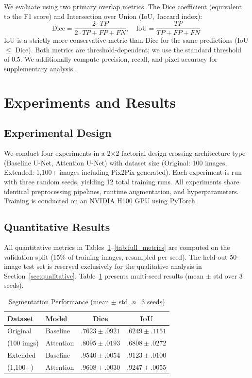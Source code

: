 \documentclass[conference]{IEEEtran}
\begin{document}
We evaluate using two primary overlap metrics. The Dice coefficient (equivalent to the F1 score) and Intersection over Union (IoU, Jaccard index):
\begin{equation}
\text{Dice} = \frac{2 \cdot TP}{2 \cdot TP + FP + FN}, \quad \text{IoU} = \frac{TP}{TP + FP + FN}
\end{equation}
IoU is a strictly more conservative metric than Dice for the same predictions (IoU $\leq$ Dice). Both metrics are threshold-dependent; we use the standard threshold of 0.5. We additionally compute precision, recall, and pixel accuracy for supplementary analysis.

\section{Experiments and Results}
\label{sec:experiments}

\subsection{Experimental Design}

We conduct four experiments in a 2$\times$2 factorial design crossing architecture type (Baseline U-Net, Attention U-Net) with dataset size (Original: 100 images, Extended: 1,100+ images including Pix2Pix-generated). Each experiment is run with three random seeds, yielding 12 total training runs. All experiments share identical preprocessing pipelines, runtime augmentation, and hyperparameters. Training is conducted on an NVIDIA H100 GPU using PyTorch.

\subsection{Quantitative Results}

All quantitative metrics in Tables~\ref{tab:main_results}--\ref{tab:full_metrics} are computed on the validation split (15\% of training images, resampled per seed). The held-out 50-image test set is reserved exclusively for the qualitative analysis in Section~\ref{sec:qualitative}. Table~\ref{tab:main_results} presents multi-seed results (mean $\pm$ std over 3 seeds).

\begin{table}[t]
\caption{Segmentation Performance (mean $\pm$ std, $n$=3 seeds)}
\label{tab:main_results}
\centering
\begin{tabular}{llcc}
\toprule
\textbf{Dataset} & \textbf{Model} & \textbf{Dice} & \textbf{IoU} \\
\midrule
Original & Baseline & $.7623 \pm .0921$ & $.6249 \pm .1151$ \\
(100 imgs) & Attention & $.8095 \pm .0193$ & $.6808 \pm .0272$ \\
\midrule
Extended & Baseline & $.9540 \pm .0054$ & $.9123 \pm .0100$ \\
(1,100+) & Attention & $\mathbf{.9608 \pm .0030}$ & $\mathbf{.9247 \pm .0055}$ \\
\bottomrule
\end{tabular}
\end{table}
\end{document}
